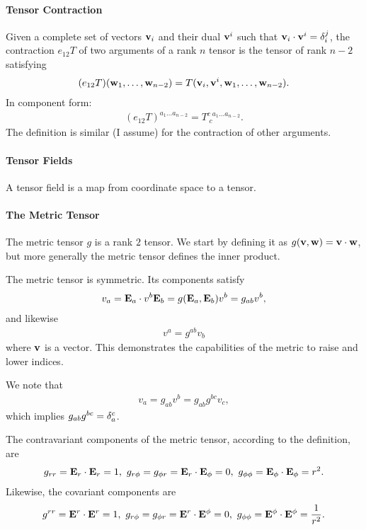 \paragraph{Tensor Contraction}
Given a complete set of vectors $\vb{v}_{i}$ and their dual $\vb{v}^{i}$ such that $\vb{v}_{i}\cdot\vb{v}^{i} = \delta_{i}^{j}$, the contraction $e_{12}T$ of two arguments of a rank $n$ tensor is the tensor of rank $n - 2$ satisfying
\begin{align*}
	(e_{12}T)(\vb{w}_{1}, \dots, \vb{w}_{n - 2}) = T(\vb{v}_{i}, \vb{v}^{i}, \vb{w}_{1}, \dots, \vb{w}_{n - 2}).
\end{align*}
In component form:
\begin{align*}
	(e_{12}T)^{a_{1}\dots a_{n - 2}} = T^{c\;a_{1}\dots a_{n - 2}}_{\;c}.
\end{align*}
The definition is similar (I assume) for the contraction of other arguments.

\paragraph{Tensor Fields}
A tensor field is a map from coordinate space to a tensor.

\paragraph{The Metric Tensor}
The metric tensor $g$ is a rank $2$ tensor. We start by defining it as $g(\vb{v}, \vb{w}) = \vb{v}\cdot\vb{w}$, but more generally the metric tensor defines the inner product.

The metric tensor is symmetric. Its components satisfy
\begin{align*}
	v_{a} = \vb{E}_{a}\cdot v^{b}\vb{E}_{b} = g(\vb{E}_{a}, \vb{E}_{b})v^{b} = g_{ab}v^{b},
\end{align*}
and likewise
\begin{align*}
	v^{a} = g^{ab}v_{b}
\end{align*}
where $\vb{v}$ is a vector. This demonstrates the capabilities of the metric to raise and lower indices.

We note that
\begin{align*}
	v_{a} = g_{ab}v^{b} = g_{ab}g^{bc}v_{c},
\end{align*}
which implies $g_{ab}g^{bc} = \delta_{a}^{c}$.

The contravariant components of the metric tensor, according to the definition, are
\begin{align*}
	g_{rr} = \vb{E}_{r}\cdot\vb{E}_{r} = 1,\ g_{r\phi} = g_{\phi r} = \vb{E}_{r}\cdot\vb{E}_{\phi} = 0,\ g_{\phi\phi} = \vb{E}_{\phi}\cdot\vb{E}_{\phi} = r^{2}.
\end{align*}
Likewise, the covariant components are
\begin{align*}
	g^{rr} = \vb{E}^{r}\cdot\vb{E}^{r} = 1,\ g_{r\phi} = g_{\phi r} = \vb{E}^{r}\cdot\vb{E}^{\phi} = 0,\ g_{\phi\phi} = \vb{E}^{\phi}\cdot\vb{E}^{\phi} = \frac{1}{r^{2}}.
\end{align*}